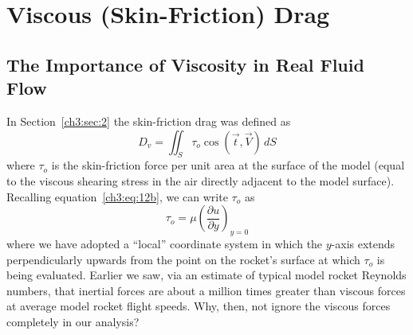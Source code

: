 \section{Viscous (Skin-Friction) Drag}\label{ch3:sec:3}

\subsection{The Importance of Viscosity in Real Fluid Flow}\label{ch3:sec:3.1}

In Section~\ref{ch3:sec:2} the skin-friction drag was defined as
\begin{equation}\label{ch3:eq:33}
D_v = \iint_{S} \tau_o \cos(\vec{t},\vec{V})\,dS
\end{equation}
where $\tau_o$ is the skin-friction force per unit area at the surface of the
model (equal to the viscous shearing stress in the air directly adjacent to
the model surface). Recalling equation~\eqref{ch3:eq:12b}, we can write
$\tau_o$ as
\begin{equation}\label{ch3:eq:34}
\tau_o = \mu\left(\frac{\partial u}{\partial y}\right)_{y=0}
\end{equation}
where we have adopted a ``local'' coordinate system in which the $y$-axis
extends perpendicularly upwards from the point on the rocket's surface at
which $\tau_o$ is being evaluated. Earlier we saw, via an estimate of typical
model rocket Reynolds numbers, that inertial forces are about a million times
greater than viscous forces at average model rocket flight speeds. Why, then,
not ignore the viscous forces completely in our analysis?


